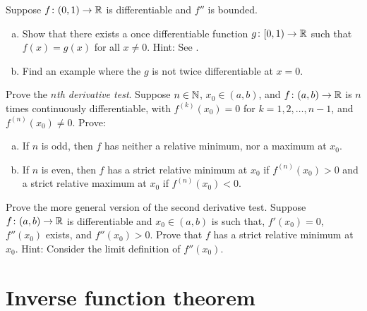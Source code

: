 \begin{exercise} \label{exercise:extendboundedder2}
Suppose $f \colon (0,1) \to {\mathbb{R}}$ is differentiable and $f''$
is bounded.
\begin{enumerate}[a)]
\item
Show that there exists a once differentiable function $g \colon [0,1) \to {\mathbb{R}}$
such that $f(x) = g(x)$ for all $x \neq 0$.  Hint: 
See
.
\item
Find an example where the $g$ is not twice differentiable at $x=0$.
\end{enumerate}
\end{exercise}

\begin{exercise}
Prove the
\emph{$n$th derivative test}.
Suppose $n \in {\mathbb{N}}$,
$x_0 \in (a,b)$, and $f \colon (a,b) \to {\mathbb{R}}$ is $n$ times continuously
differentiable, with $f^{(k)}(x_0) = 0$ for $k=1,2,\ldots,n-1$, and
$f^{(n)}(x_0)
\neq 0$.
Prove:
\begin{enumerate}[a)]
\item
If $n$ is odd, then $f$ has neither a relative minimum,
nor a maximum at $x_0$.
\item
If $n$ is even, then $f$ has a strict relative minimum at $x_0$ if
$f^{(n)}(x_0) > 0$
and a strict relative maximum at $x_0$ if $f^{(n)}(x_0) < 0$.
\end{enumerate}
\end{exercise}

\begin{exercise}
Prove the more general version of the second derivative test.
Suppose $f \colon (a,b) \to {\mathbb{R}}$ is differentiable and $x_0 \in (a,b)$
is such that, $f'(x_0) = 0$, $f''(x_0)$ exists, and $f''(x_0) > 0$.
Prove that $f$ has a strict relative
minimum at $x_0$.  Hint: Consider the limit definition of $f''(x_0)$.
\end{exercise}


\sectionnewpage
\section{Inverse function theorem}
\label{sec:ift}



